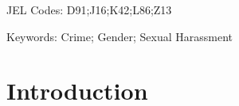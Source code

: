 \documentclass[AER,draftmode]{AEA}
\begin{document}
JEL Codes: D91;J16;K42;L86;Z13 

Keywords: Crime; Gender; Sexual Harassment















\clearpage
\section{Introduction}
\end{document}
